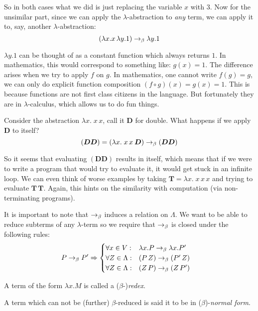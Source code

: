 So in both cases what we did is just replacing the variable $x$ with $3$. Now
for the unsimilar part, since we can apply the $\lambda$-abstraction to
\emph{any} term, we can apply it to, say, another $\lambda$-abstraction:
    \[ (\lambda x. x\, \lambda y. 1) \rightarrow_\beta \lambda y. 1 \]

$\lambda y. 1$ can be thought of as a constant function which always returns
$1$.  In mathematics, this would correspond to something like: $g(x) = 1$.  The
difference arises when we try to apply $f$ on $g$. In mathematics, one cannot
write $f(g) = g$, we can only do explicit function composition $(f \circ g)(x) =
g(x) = 1$. This is because functions are not first class citizens in the
language. But fortunately they are in $\lambda$-calculus, which allows us to do
fun things.

Consider the abstraction $\lambda x.\; x\, x$, call it $\bm{D}$ for double.
What happens if we apply $\bm{D}$ to itself?
    \[ (\bm{D} \bm{D}) = (\lambda x.\; x\, x\: \bm{D})
        \rightarrow_\beta (\bm{D} \bm{D}) \]

So it seems that evaluating $(\bm{D} \bm{D})$ results in itself, which means
that if we were to write a program that would try to evaluate it, it would get
stuck in an infinite loop. We can even think of worse examples by taking
$\bm{T} = \lambda x.\; x\, x\,x$ and trying to evaluate $\bm{T}\, \bm{T}$.
Again, this hints on the similarity with computation (via non-terminating
programs).

It is important to note that $\rightarrow_\beta$ induces a relation on $\Lambda$. We
want to be able to reduce subterms of any $\lambda$-term so we require that
$\rightarrow_\beta$ is closed under the following rules:
\begin{align*}
    P \rightarrow_\beta P' &\Rightarrow
        \begin{cases}
            \forall x \in V: & \lambda x.P \rightarrow_\beta \lambda x. P' \\
            \forall Z \in \Lambda: & (P\, Z) \rightarrow_\beta (P'\, Z) \\
            \forall Z \in \Lambda: & (Z\, P) \rightarrow_\beta (Z\, P')
        \end{cases}
\end{align*}

\begin{definition}
    A term of the form $\lambda x. M$ is called a ($\beta$-)\emph{redex}.
\end{definition}
\begin{definition}
    A term which can not be (further) $\beta$-reduced is said it to be in
    ($\beta$)-\emph{normal form}.
\end{definition}

